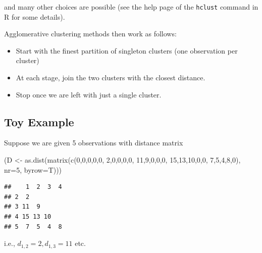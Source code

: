 \documentclass[
]{book}
\newenvironment{Shaded}{\begin{snugshade}}{\end{snugshade}}
\newcommand{\AttributeTok}[1]{\textcolor[rgb]{0.77,0.63,0.00}{#1}}
\newcommand{\DecValTok}[1]{\textcolor[rgb]{0.00,0.00,0.81}{#1}}
\newcommand{\FunctionTok}[1]{\textcolor[rgb]{0.00,0.00,0.00}{#1}}
\newcommand{\NormalTok}[1]{#1}
\newcommand{\OtherTok}[1]{\textcolor[rgb]{0.56,0.35,0.01}{#1}}
\theoremstyle{definition}
\theoremstyle{definition}
\theoremstyle{definition}
\theoremstyle{definition}
\theoremstyle{remark}
\begin{document}
and many other choices are possible (see the help page of the \texttt{hclust} command in R for some details).

Agglomerative clustering methods then work as follows:

\begin{itemize}
\item
  Start with the finest partition of singleton clusters (one observation per cluster)
\item
  At each stage, join the two clusters with the closest distance.
\item
  Stop once we are left with just a single cluster.
\end{itemize}

\hypertarget{toy-example}{%
\subsection{Toy Example}\label{toy-example}}

Suppose we are given 5 observations with distance matrix

\begin{Shaded}
\begin{Highlighting}[]
\NormalTok{(D }\OtherTok{\textless{}{-}} \FunctionTok{as.dist}\NormalTok{(}\FunctionTok{matrix}\NormalTok{(}\FunctionTok{c}\NormalTok{(}\DecValTok{0}\NormalTok{,}\DecValTok{0}\NormalTok{,}\DecValTok{0}\NormalTok{,}\DecValTok{0}\NormalTok{,}\DecValTok{0}\NormalTok{,}
                      \DecValTok{2}\NormalTok{,}\DecValTok{0}\NormalTok{,}\DecValTok{0}\NormalTok{,}\DecValTok{0}\NormalTok{,}\DecValTok{0}\NormalTok{,}
                      \DecValTok{11}\NormalTok{,}\DecValTok{9}\NormalTok{,}\DecValTok{0}\NormalTok{,}\DecValTok{0}\NormalTok{,}\DecValTok{0}\NormalTok{,}
                      \DecValTok{15}\NormalTok{,}\DecValTok{13}\NormalTok{,}\DecValTok{10}\NormalTok{,}\DecValTok{0}\NormalTok{,}\DecValTok{0}\NormalTok{,}
                      \DecValTok{7}\NormalTok{,}\DecValTok{5}\NormalTok{,}\DecValTok{4}\NormalTok{,}\DecValTok{8}\NormalTok{,}\DecValTok{0}\NormalTok{), }\AttributeTok{nr=}\DecValTok{5}\NormalTok{, }\AttributeTok{byrow=}\NormalTok{T)))}
\end{Highlighting}
\end{Shaded}

\begin{verbatim}
##    1  2  3  4
## 2  2         
## 3 11  9      
## 4 15 13 10   
## 5  7  5  4  8
\end{verbatim}

i.e., \(d_{1,2}=2, d_{1,3}=11\) etc.
\end{document}
